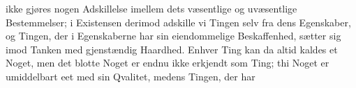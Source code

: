 \documentclass[12pt]{book}
\newcommand{\opage}[1]{\marginnote{\footnotesize\textit{[#1]}}}
\begin{document}
ikke gjøres nogen Adskillelse imellem dets væsentlige og uvæsentlige Bestemmelser; i
Existensen derimod adskille vi Tingen selv fra dens Egenskaber, og Tingen, der i
Egenskaberne har sin eiendommelige Beskaffenhed, sætter sig imod Tanken med
gjenstændig Haardhed. Enhver Ting kan da altid kaldes et Noget, men det blotte Noget
er endnu ikke erkjendt som Ting; thi Noget er umiddelbart eet med sin Qvalitet,
medens Tingen, der har
\opage{127} %
\end{document}
